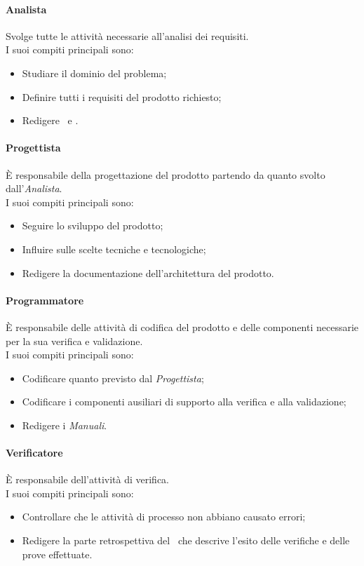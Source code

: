 \paragraph*{Analista}
Svolge tutte le attività necessarie all'analisi dei requisiti.\\
I suoi compiti principali sono:
\begin{itemize}
	\item Studiare il dominio del problema;
	\item Definire tutti i requisiti del prodotto richiesto;
	\item Redigere \SdFv\ e \textit{\AdR}.
\end{itemize}

\paragraph*{Progettista}
È responsabile della progettazione del prodotto partendo da quanto svolto dall'\textit{Analista}.\\
I suoi compiti principali sono:
\begin{itemize}
	\item Seguire lo sviluppo del prodotto;
	\item Influire sulle scelte tecniche e tecnologiche;
	\item Redigere la documentazione dell'architettura del prodotto.
\end{itemize}

\paragraph*{Programmatore}
È responsabile delle attività di codifica del prodotto e delle componenti necessarie per la sua verifica e validazione.\\
I suoi compiti principali sono:
\begin{itemize}
	\item Codificare quanto previsto dal \textit{Progettista};
	\item Codificare i componenti ausiliari di supporto alla verifica e alla validazione;
	\item Redigere i \textit{Manuali}.
\end{itemize}

\paragraph*{Verificatore}
È responsabile dell'attività di verifica.\\
I suoi compiti principali sono:
\begin{itemize}
	\item Controllare che le attività di processo non abbiano causato errori;
	\item Redigere la parte retrospettiva del \PdQv\ che descrive l'esito delle verifiche e delle prove effettuate.
\end{itemize}


